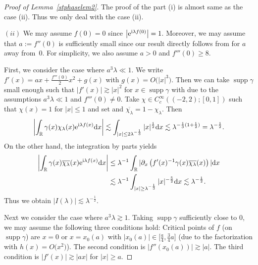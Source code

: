 \documentclass[10pt,a4paper]{amsart}
\numberwithin{equation}{section}
\def\R{\mathbb{R}}%
\DeclareMathOperator{\supp}{supp}%
\def\c{\gamma}
\def\l{\lambda}
\def\pa{\partial}
\begin{document}
\begin{proof}[Proof of Lemma~\ref{stphaselem2}]
The proof of the part (i) is almost same as the case (ii). Thus we only deal with the case (ii).

$(ii)$ We may assume $f(0)=0$ since $\big|{\rm e}^{{\rm i}\l f(0)}\big|=1$. Moreover, we may assume that $a:=f''(0)$ is sufficiently small since our result directly follows from \cite[p.334, Corollary]{S} for $a$ away from~$0$. For simplicity, we also assume $a>0$ and $f'''(0)\geq 8$.


First, we consider the case where $a^3\l\ll 1$. We write $f'(x)=ax+\frac{f'''(0)}{2}x^2+g(x)$ with ${g(x)=O\bigl(|x|^3\bigr)}$. Then we can take $\supp \c$ small enough such that $|f'(x)|\gtrsim |x|^2$ for $x\in \supp \c$ with \smash{$|x|\geq \l^{-\frac{1}{3}}$} due to the assumptions $a^3\l\ll 1$ and $f'''(0)\neq 0$.
Take $\chi\in C_c^{\infty}((-2,2);[0,1])$ such that $\chi(x)=1$ for $|x|\leq 1$ and set \smash{$\chi_{\l}(x)=\chi\bigl(\l^{\frac{1}{3}}xv)$} and $\overline{\chi_{\l}}=1-\chi_{\l}$. Then
\[
\left|\int_{\R}\c(x)\chi_{\l}(x){\rm e}^{{\rm i}\l f(x)}{\rm d}x\right|\lesssim \int_{|x|\leq 2\l^{-\frac{1}{3}}}|x|^{\frac{1}{2}} {\rm d}x\lesssim \l^{-\frac{1}{3}(1+\frac{1}{2})}=\l^{-\frac{1}{2}}.
\]
 On the other hand, the integration by parts yields
\begin{align*}
\left|\int_{\R}\c(x)\overline{\chi_{\l}}(x){\rm e}^{{\rm i}\l f(x)}{\rm d}x\right|&\leq \l^{-1}\int_{\R}|\pa_x\left(f'(x)^{-1}\c(x)\overline{\chi_{\l}}(x) \right)|{\rm d}x\\
&\lesssim \l^{-1}\int_{|x|\geq \l^{-\frac{1}{3}}}|x|^{-\frac{5}{2}}{\rm d}x\lesssim \l^{-\frac{1}{2}}.
\end{align*}
Thus we obtain $|I(\l)|\lesssim \l^{-\frac{1}{2}}$.

Next we consider the case where $a^3\l\gtrsim 1$. Taking $\supp \c$ sufficiently close to $0$, we may assume the following three conditions hold: Critical points of $f$ (on $\supp \c$) are $x=0$ or $x=x_0(a)$ with ${|x_0(a)|\in \bigl[\frac{a}{4}, \frac{3}{4}a\bigr]}$ \big(due to the factorization  with $h(x)=O\bigl(x^2\bigr)$\big). The second condition is $|f''(x_0(a))|\gtrsim |a|$. The third condition is $|f'(x)|\gtrsim |ax|$ for $|x|\geq a$.


\end{proof}
\end{document}
